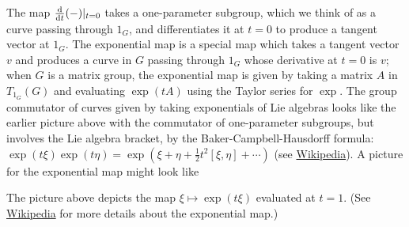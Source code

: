 \documentclass[../../rtnotes.tex]{subfiles}
\begin{document}
The map $\dv{t}(-)|_{t=0}$ takes a one-parameter subgroup, which we think of as a curve passing through $1_G$, and differentiates it at $t=0$ to produce a tangent vector at $1_G$. The exponential map is a special map which takes a tangent vector $v$ and produces a curve in $G$ passing through $1_G$ whose derivative at $t=0$ is $v$; when $G$ is a matrix group, the exponential map is given by taking a matrix $A$ in $T_{1_G}(G)$ and evaluating $\exp(tA)$ using the Taylor series for $\exp$. The group commutator of curves given by taking exponentials of Lie algebras looks like the earlier picture above with the commutator of one-parameter subgroups, but involves the Lie algebra bracket, by the Baker-Campbell-Hausdorff formula: $\exp(t\xi)\exp(t\eta) = \exp(\xi+\eta + \frac{1}{2}t^2[\xi,\eta] + \cdots)$ (see \href{https://en.wikipedia.org/wiki/Baker%E2%80%93Campbell%E2%80%93Hausdorff_formula}{Wikipedia}). A picture for the exponential map might look like
\begin{figure}[h]
  \centering
\end{figure}

The picture above depicts the map $\xi\mapsto \exp(t\xi)$ evaluated at $t = 1$. (See \href{https://en.wikipedia.org/wiki/Exponential_map_(Lie_theory)}{Wikipedia} for more details about the exponential map.)
\end{document}
